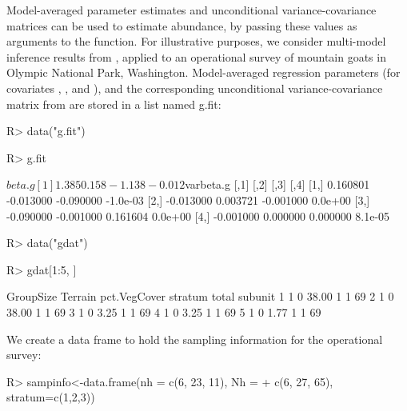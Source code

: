 \documentclass[nojss]{jss}
\begin{document}
Model-averaged parameter estimates and unconditional
variance-covariance matrices can be used to estimate abundance, by
passing these values as arguments to the  function.
For illustrative purposes, we consider multi-model inference results
from \citet{Rice2009}, applied to an operational survey of mountain
goats in Olympic National Park, Washington. Model-averaged
regression parameters (for covariates ,
, and ), and the corresponding
unconditional variance-covariance matrix from \citet{Rice2009} are
stored in a list named g.fit:
\begin{Schunk}
\begin{Sinput}
R> data("g.fit")
\end{Sinput}
\end{Schunk}
\begin{Schunk}
\begin{Sinput}
R> g.fit
\end{Sinput}
\begin{Soutput}
$beta.g
[1]  1.385  0.158 -1.138 -0.012

$varbeta.g
          [,1]      [,2]      [,3]     [,4]
[1,]  0.160801 -0.013000 -0.090000 -1.0e-03
[2,] -0.013000  0.003721 -0.001000  0.0e+00
[3,] -0.090000 -0.001000  0.161604  0.0e+00
[4,] -0.001000  0.000000  0.000000  8.1e-05
\end{Soutput}
\end{Schunk}
\begin{Schunk}
\begin{Sinput}
R> data("gdat")
\end{Sinput}
\end{Schunk}
\begin{Schunk}
\begin{Sinput}
R> gdat[1:5, ]
\end{Sinput}
\begin{Soutput}
  GroupSize Terrain pct.VegCover stratum total subunit
1         1       0        38.00       1     1      69
2         1       0        38.00       1     1      69
3         1       0         3.25       1     1      69
4         1       0         3.25       1     1      69
5         1       0         1.77       1     1      69
\end{Soutput}
\end{Schunk}
We create a data frame to hold the sampling information for the
operational survey:
\begin{Schunk}
\begin{Sinput}
R> sampinfo<-data.frame(nh = c(6, 23, 11), Nh =
+  c(6, 27, 65), stratum=c(1,2,3))
\end{Sinput}
\end{Schunk}
\end{document}
